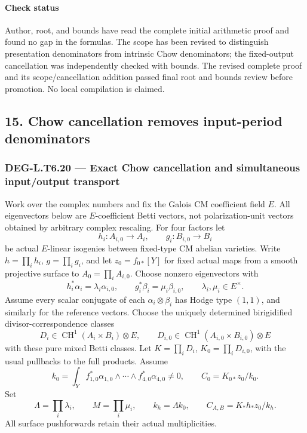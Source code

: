 \documentclass[11pt,a4paper]{article}
\theoremstyle{definition}
\begin{document}
\paragraph{Check status}\label{rallis_t6_proofs-check-status}

Author, root, and bounds have read the complete initial arithmetic proof and found no gap in the formulas. The scope has been revised to distinguish presentation denominators from intrinsic Chow denominators; the fixed-output cancellation was independently checked with bounds. The revised complete proof and its scope/cancellation addition passed final root and bounds review before promotion. No local compilation is claimed.

\subsection{15. Chow cancellation removes input-period denominators}\label{chow-cancellation-removes-input-period-denominators}

\subsubsection{DEG-L.T6.20 --- Exact Chow cancellation and simultaneous input/output transport}\label{DEG-L.T6.20}

Work over the complex numbers and fix the Galois CM coefficient field \(E\). All eigenvectors below are \(E\)-coefficient Betti vectors, not polarization-unit vectors obtained by arbitrary complex rescaling. For four factors let \[
 h_i:A_{i,0}\longrightarrow A_i,\qquad
 g_i:B_{i,0}\longrightarrow B_i
\] be actual \(E\)-linear isogenies between fixed-type CM abelian varieties. Write \(h=\prod_i h_i\), \(g=\prod_i g_i\), and let \(z_0=f_{0*}[Y]\) for fixed actual maps from a smooth projective surface to \(A_0=\prod_iA_{i,0}\). Choose nonzero eigenvectors with \[
 h_i^*\alpha_i=\lambda_i\alpha_{i,0},\qquad
 g_i^*\beta_i=\mu_i\beta_{i,0},\qquad
 \lambda_i,\mu_i\in E^\times.
 \tag{T20.1}
\] Assume every scalar conjugate of each \(\alpha_i\otimes\beta_i\) has Hodge type \((1,1)\), and similarly for the reference vectors. Choose the uniquely determined birigidified divisor-correspondence classes \[
 D_i\in\operatorname{CH}^1(A_i\times B_i)\otimes E,
 \qquad
 D_{i,0}\in\operatorname{CH}^1(A_{i,0}\times B_{i,0})\otimes E
\] with these pure mixed Betti classes. Let \(K=\prod_iD_i\), \(K_0=\prod_iD_{i,0}\), with the usual pullbacks to the full products. Assume \[
 k_0=\int_Y f_{1,0}^*\alpha_{1,0}\wedge\cdots\wedge
                         f_{4,0}^*\alpha_{4,0}\ne0,
 \qquad C_0=K_{0*}z_0/k_0.
\] Set \[
 \Lambda=\prod_i\lambda_i,\qquad M=\prod_i\mu_i,
 \qquad k_h=\Lambda k_0,\qquad
 C_{A,B}=K_*h_*z_0/k_h.
\] All surface pushforwards retain their actual multiplicities.
\end{document}
